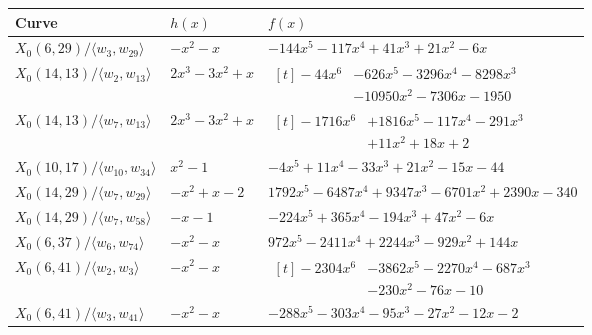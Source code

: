 \documentclass[12pt]{amsart}
\numberwithin{equation}{subsection}
\theoremstyle{plain}\newtheorem{ithm}{Theorem}
\theoremstyle{plain}\newtheorem{iprop}[ithm]{Proposition}
\theoremstyle{definition}
\theoremstyle{remark}
\newcommand{\Curve}[2]{X_0({#1},{#2})} %
\begin{document}
\begin{table}
\centering
\small
\renewcommand{\arraystretch}{1.1}
\begin{tabular}{lll}
\hline
\textbf{Curve} & $h(x)$  & $f(x)$   \\
\hline

$\Curve{6}{29}/\langle w_3, w_{29} \rangle$
&
$-x^2-x$ & $-144x^5-117x^4+41x^3+21x^2-6x$

\\

$\Curve{14}{13}/\langle w_2, w_{13} \rangle$
&
$2x^3-3x^2+x$ &$\begin{aligned}[t]-44x^6&-626x^5-3296x^4-8298x^3\\
&-10950x^2-7306x-1950\end{aligned}$

\\

$\Curve{14}{13}/\langle w_7, w_{13} \rangle$
&
$2x^3-3x^2+x$ &$\begin{aligned}[t]-1716x^6&+1816x^5-117x^4-291x^3\\
&+11x^2+18x+2\end{aligned}$

\\

$\Curve{10}{17}/\langle w_{10}, w_{34} \rangle$
&
$x^2-1$ & $-4x^5+11x^4-33x^3+21x^2-15x-44$

\\

$\Curve{14}{29}/\langle w_7, w_{29} \rangle$
&
$-x^2+x-2$ &$1792x^5-6487x^4+9347x^3-6701x^2+2390x-340$

\\

$\Curve{14}{29}/\langle w_7, w_{58} \rangle$
&
$-x-1$&$-224x^5+365x^4-194x^3+47x^2-6x$

\\

$\Curve{6}{37}/\langle w_6, w_{74} \rangle$
&
$-x^2-x$ &$972x^5-2411x^4+2244x^3-929x^2+144x$

\\

$\Curve{6}{41}/\langle w_2, w_3 \rangle$
&
$-x^2-x$ & $\begin{aligned}[t]-2304x^6&-3862x^5-2270x^4-687x^3\\
&-230x^2-76x-10\end{aligned}$

\\

$\Curve{6}{41}/\langle w_3, w_{41} \rangle$
&
$-x^2-x$ &$-288x^5-303x^4-95x^3-27x^2-12x-2$


\end{tabular}
\end{table}
\end{document}
